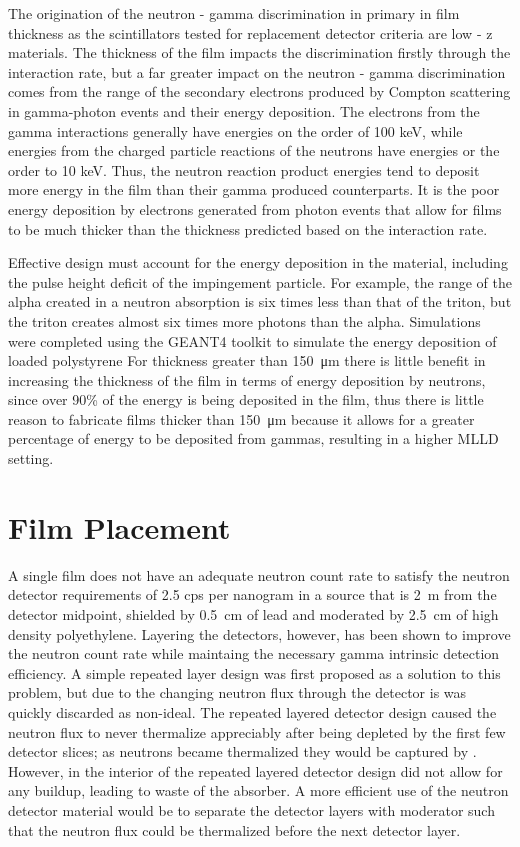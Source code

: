 The origination of the neutron - gamma discrimination in primary in film thickness as the scintillators tested for replacement detector criteria are low - z materials.
The thickness of the film impacts the discrimination firstly through the interaction rate, but a far greater impact on the neutron - gamma discrimination comes from the range of the secondary electrons produced by Compton scattering in gamma-photon events and their energy deposition.
The electrons from the gamma interactions generally have energies on the order of 100 keV, while energies from the charged particle reactions of the neutrons have energies or the order to 10 keV.
Thus, the neutron reaction product energies tend to deposit more energy in the film than their gamma produced counterparts.
It is the poor energy deposition by electrons generated from photon events that allow for films to be much thicker than the thickness predicted based on the interaction rate.

Effective design must account for the energy deposition in the material, including the pulse height deficit of the impingement particle.
For example, the range of the alpha created in a  neutron absorption is six times less than that of the triton, but the triton creates almost six times more photons than the alpha.
Simulations were completed using the GEANT4 toolkit to simulate the energy deposition of  loaded polystyrene
For thickness greater than \SI{150}{\um} there is little benefit in increasing the thickness of the film in terms of energy deposition by neutrons, since over 90\% of the energy is being deposited in the film, thus there is little reason to fabricate films thicker than \SI{150}{\um} because it allows for a greater percentage of energy to be deposited from gammas, resulting in a higher MLLD setting.

\section{Film Placement}
A single film does not have an adequate neutron count rate to satisfy the neutron detector requirements of 2.5 cps per nanogram  in a source that is \SI{2}{\m} from the detector midpoint, shielded by \SI{0.5}{\cm} of lead and moderated by \SI{2.5}{\cm} of high density polyethylene.
Layering the detectors, however, has been shown to improve the neutron count rate while maintaing the necessary gamma intrinsic detection efficiency.
A simple repeated layer design was first proposed as a solution to this problem, but due to the changing neutron flux through the detector is was quickly discarded as non-ideal.
The repeated layered detector design caused the neutron flux to never thermalize appreciably after being depleted by the first few detector slices; as neutrons became thermalized they would be captured by .
However, in the interior of the repeated layered detector design did not allow for any buildup, leading to waste of the absorber.
A more efficient use of the neutron detector material would be to separate the detector layers with moderator such that the neutron flux could be thermalized before the next detector layer.

